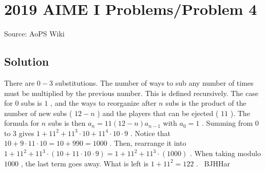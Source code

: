 \documentclass[12pt]{article}
\begin{document}
\section*{{2019 AIME I Problems/Problem 4}}
Source: AoPS Wiki

\subsection*{Solution}
There are $0-3$ substitutions. The number of ways to sub any number of times must be multiplied by the previous number. This is defined recursively. The case for $0$ subs is $1$ , and the ways to reorganize after $n$ subs is the product of the number of new subs ( $12-n$ ) and the players that can be ejected ( $11$ ). The formula for $n$ subs is then $a_n=11(12-n)a_{n-1}$ with $a_0=1$ . Summing from $0$ to $3$ gives $1+11^2+11^{3}\cdot 10+11^{4}\cdot 10\cdot 9$ . Notice that $10+9\cdot11\cdot10=10+990=1000$ . Then, rearrange it into $1+11^2+11^3\cdot (10+11\cdot10\cdot9)= 1+11^2+11^3\cdot (1000)$ . When taking modulo $1000$ , the last term goes away. What is left is $1+11^2=\boxed{122}$ . ~BJHHar
\end{document}
